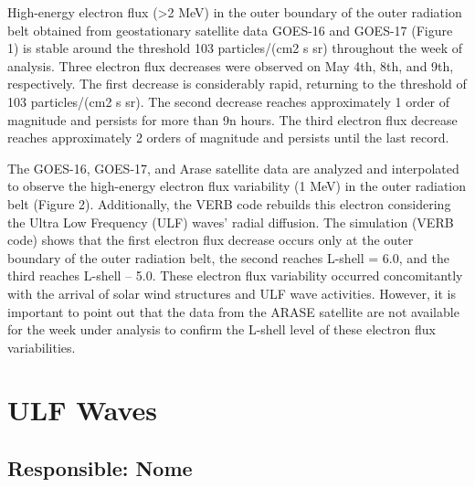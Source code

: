 \documentclass[a4paper, 10pt]{article}
\begin{document}
                     High-energy electron flux (>2 MeV) in the outer boundary of the outer radiation belt obtained from geostationary satellite data GOES-16 and GOES-17 (Figure 1) is stable around the threshold 103 particles/(cm2 s sr) throughout the week of analysis. Three electron flux decreases were observed on May 4th, 8th, and 9th, respectively. The first decrease is considerably rapid, returning to the threshold of 103 particles/(cm2 s sr). The second decrease reaches approximately 1 order of magnitude and persists for more than 9n hours. The third electron flux decrease reaches approximately 2 orders of magnitude and persists until the last record.    

The GOES-16, GOES-17, and Arase satellite data are analyzed and interpolated to observe the high-energy electron flux variability (1 MeV) in the outer radiation belt (Figure 2). Additionally, the VERB code rebuilds this electron considering the Ultra Low Frequency (ULF) waves' radial diffusion. The simulation (VERB code) shows that the first electron flux decrease occurs only at the outer boundary of the outer radiation belt, the second reaches L-shell = 6.0, and the third reaches L-shell – 5.0. These electron flux variability occurred concomitantly with the arrival of solar wind structures and ULF wave activities. However, it is important to point out that the data from the ARASE satellite are not available for the week under analysis to confirm the L-shell level of these electron flux variabilities.\section{ULF Waves} 
 \subsection{Responsible: Nome} 
 
\end{document}
